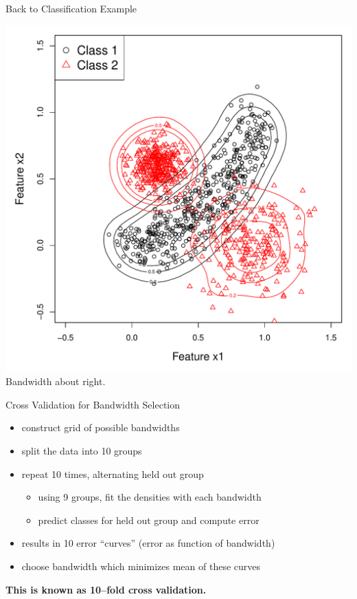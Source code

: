 \documentclass[12pt]{beamer}
\begin{document}
\begin{frame}{Back to Classification Example}

  \begin{center}
    \includegraphics[scale=0.4]{figs/kde2d2.pdf}\\
    Bandwidth about right.
  \end{center}
  
\end{frame}






\begin{frame}{Cross Validation for Bandwidth Selection}
  \begin{itemize}
  \item construct grid of possible bandwidths
  \item split the data into 10 groups
  \item repeat 10 times, alternating held out group
    \begin{itemize}
    \item using 9 groups, fit the densities with each bandwidth
    \item predict classes for held out  group and compute error
    \end{itemize}
  \item results in 10 error ``curves'' (error as function of bandwidth)
  \item choose bandwidth which minimizes mean of these curves
  \end{itemize}

\vspace{.2in}
  
  \begin{center}
    \textbf{This is known as 10--fold cross validation.}
  \end{center}
\end{frame}
\end{document}
